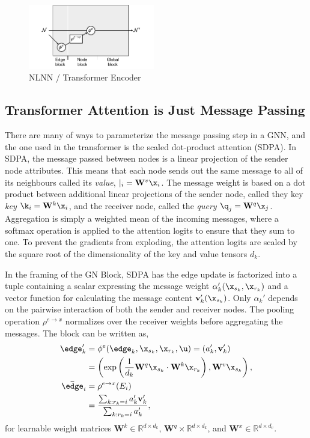 \begin{figure}
    \centering
    \includegraphics[width=0.49\textwidth]{Figures/graph_networks/nonlocal.pdf}
    \caption{NLNN / Transformer Encoder}
    \label{fig:transformer}
\end{figure}

\subsection{Transformer Attention is Just Message Passing}
\label{sec:attention}

There are many of ways to parameterize the message passing step in a GNN, and the one used in the transformer is the scaled dot-product attention (SDPA).
In SDPA, the message passed between nodes is a linear projection of the sender node attributes.
This means that each node sends out the same message to all of its neighbours called its \textit{value}, $\vert_{i} = \mathbf{W}^v \x_i$.
The message weight is based on a dot product between additional linear projections of the sender node, called they key \textit{key} $\k_{i} = \mathbf{W}^k \x_i$, and the receiver node, called the \textit{query} $\q_{j} = \mathbf{W}^q \x_j$.
Aggregation is simply a weighted mean of the incoming messages, where a softmax operation is applied to the attention logits to ensure that they sum to one.
To prevent the gradients from exploding, the attention logits are scaled by the square root of the dimensionality of the key and value tensors $d_k$.

In the framing of the GN Block, SDPA has the edge update is factorized into a tuple containing a scalar expressing the message weight $\alpha_k'(\x_{s_k}, \x_{r_k})$ and a vector function for calculating the message content $\mathbf{v}_k'(\x_{s_k})$.
Only $\alpha_k'$ depends on the pairwise interaction of both the sender and receiver nodes.
The pooling operation $\rho^{e \to x}$ normalizes over the receiver weights before aggregating the messages.
The block can be written as,
\begin{equation}
    \begin{aligned}
        \edge_k' &= \phi^e(\edge_k, \x_{s_k}, \x_{r_k}, \u)
        = ( a_k', \mathbf{v}_k' ) \\
        &= \left( \exp \left( \frac{1}{d_k} \mathbf{W}^q \x_{s_k} \cdot \mathbf{W}^k \x_{r_k} \right), \mathbf{W}^v \x_{s_k} \right), \\
        \mathbf{\bar\edge}_i &= \rho^{e \to x}(E_i) \\
       &= \frac{\sum_{k: r_k = i} a_k' \mathbf{v}_k'}{\sum_{k: r_k = i} a_k'},
    \end{aligned}
\end{equation}
for learnable weight matrices $\mathbf{W}^k \in \mathbb{R}^{d \times d_k}$, $\mathbf{W}^q \times \mathbb{R}^{d \times d_k}$, and $\mathbf{W}^x \in \mathbb{R}^{d \times d_v}$.

